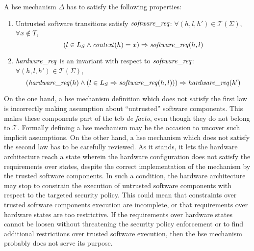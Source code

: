 \begin{definition}
  \label{def:speccert:laws}
  A \ac{hse} mechanism $\Delta$ has to satisfy the following properties:
  \begin{enumerate}
  \item Untrusted software transitions satisfy $\mathit{software\_req}$:
    $\forall (h, l, h') \in \mathcal{T}(\Sigma)$, $\forall x \not\in T$,
    \[
      (l \in L_S \wedge \mathit{context}(h) = x) \Rightarrow
      \mathit{software\_req}(h, l)
    \]
  \item $\mathit{hardware\_req}$ is an invariant with respect to
    $\mathit{software\_req}$: $\forall (h, l, h') \in \mathcal{T}(\Sigma)$,
    \[
      (\mathit{hardware\_req}(h) \wedge (l \in L_S \Rightarrow
      \mathit{software\_req}(h,l))) \Rightarrow \mathit{hardware\_req}(h')
    \]
  \end{enumerate}
\end{definition}

On the one hand, a \ac{hse} mechanism definition which does not satisfy the
first law is incorrectly making assumption about ``untrusted'' software
components.
%
This makes these components part of the \ac{tcb} \emph{de facto}, even though
they do not belong to $\mathcal{T}$.
%
Formally defining a \ac{hse} mechanism may be the occasion to uncover such
implicit assumptions.
%
On the other hand, a \ac{hse} mechanism which does not satisfy the second law
has to be carefully reviewed.
%
As it stands, it lets the hardware architecture reach a state wherein the
hardware configuration does not satisfy the requirements over states, despite
the correct implementation of the mechanism by the trusted software components.
%
In such a condition, the hardware architecture may stop to constrain the
execution of untrusted software components with respect to the targeted security
policy.
%
This could mean that constraints over trusted software components execution are
incomplete, or that requirements over hardware states are too restrictive.
%
If the requirements over hardware states cannot be loosen without threatening
the security policy enforcement or to find additional restrictions over trusted
software execution, then the \ac{hse} mechanism probably does not serve its
purpose. 

